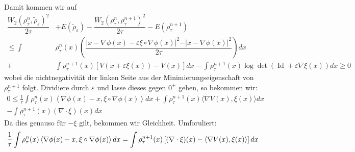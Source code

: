 \documentclass[11pt,a4paper,notitlepage]{scrreprt}
\begin{document}
Damit kommen wir auf
\begin{align}
\dfrac{W_2(\rho_\tau^n,\tilde{\rho}_\varepsilon)^2}{2\tau}&+E(\tilde{\rho}_\varepsilon)-\dfrac{W_2(\rho_\tau^n,\rho_\tau^{n+1})^2}{2\tau}-E(\rho_\tau^{n+1})\\
\leq\int&\rho_\tau^n(x)\left(\dfrac{\vert x-\nabla \phi(x)-\varepsilon\xi\circ\nabla\phi(x)\vert^2-\vert x-\nabla\phi(x)\vert^2}{2\tau}\right)dx\\
+&\int\rho_\tau^{n+1}(x)[V(x+\varepsilon\xi(x))-V(x)]dx-\int\rho_\tau^{n+1}(x)\log \det(\operatorname{Id}+\varepsilon\nabla\xi(x))dx\geq 0
\end{align}
wobei die nichtnegativität der linken Seite aus der Minimierungseigenschaft von $\rho_\tau^{n+1}$ folgt.
Dividiere durch $\varepsilon$ und lasse dieses gegen $0^+$ gehen, so bekommen wir: 
\begin{align*}
0\leq\frac{1}{\tau} \int \rho_\tau^n(x)\left\langle\nabla\phi(x)-x,\xi\circ\nabla\phi(x)\right\rangle dx+\int\rho_\tau^{n+1}(x)\langle\nabla V(x),\xi(x)\rangle dx\\-\int\rho_\tau^{n+1}(x)(\nabla\cdot \xi)(x)dx
\end{align*}
Da dies genauso für $-\xi$ gilt, bekommen wir Gleichheit. Umforuliert:
\begin{equation}
\frac{1}{\tau} \int \rho_\tau^n(x)\left\langle\nabla\phi(x)-x,\xi\circ\nabla\phi(x)\right\rangle dx\\=\int\rho_\tau^{n+1}(x)\left[(\nabla\cdot \xi)(x)-\langle\nabla V(x),\xi(x)\rangle \right]dx \label{eqwithxi}
\end{equation}
\end{document}
